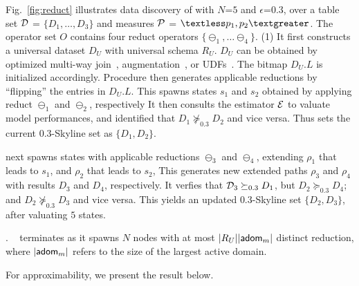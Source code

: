 \begin{example}
\label{exa-apxmodis}
Fig.~\ref{fig:reduct} illustrates data discovery 
of 
\apxmodis with $N$=$5$ and $\epsilon$=$0.3$, 
over a table set $\D$ = $\{D_1, \ldots, D_3\}$ and 
measures $\P$ = $\textless p_1, p_2\textgreater$. The operator set $O$ contains 
four reduct operators $\{\ominus_1, \ldots \ominus_4\}$. 
(1) It first constructs a 
universal dataset $D_U$ with universal schema $R_U$. $D_U$ can be 
obtained by 
optimized multi-way join~\cite{zhao2020efficient}, augmentation~\cite{li2021data}, or UDFs~\cite{dong2017arrayudf}. 
The bitmap $D_U.L$ is 
initialized accordingly. 
Procedure  
then generates applicable reductions by ``flipping'' the entries in $D_U.L$.  
This spawns states $s_1$ and $s_2$ obtained by 
applying reduct $\ominus_1$ and $\ominus_2$, 
respectively
It then consults 
the estimator $\E$ to valuate model performances, and identified that 
$D_1\not\succeq_{0.3} D_2$ and vice versa. Thus 
\apxmodis sets the current $0.3$-Skyline set 
as $\{D_1, D_2\}$.  

\apxmodis next spawns states with %
applicable reductions $\ominus_3$ and $\ominus_4$, 
extending $\rho_1$ that leads to 
$s_1$, and $\rho_2$ that leads to $s_2$, 
This generates new extended paths $\rho_3$ and $\rho_4$ 
with results $D_3$ and $D_4$, respectively. 
It verfies that 
$\D_3 \succeq_{0.3} D_1$, but 
$D_2 \succeq_{0.3} D_4$; and $D_2 \not\succeq_{0.3} D_3$ 
and vice versa. This yields an updated  
$0.3$-Skyline set $\{D_2, D_3\}$, 
after valuating $5$ states. 
\end{example}

. ~\apxmodis 
terminates as it spawns $N$ nodes with at most  
$|R_U||\ad_m|$ distinct reduction, 
where $|\ad_m|$ refers to the size 
of the largest active domain. 

\vspace{2ex}
For approximability, we present the result below. 

